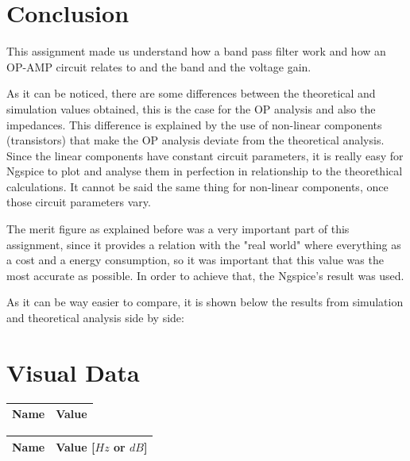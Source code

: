 \section{Conclusion}
\label{sec:conclusion}

This assignment made us understand how a band pass filter work and how an OP-AMP circuit relates to and the band and the voltage gain.\par
As it can be noticed, there are some differences between the theoretical and simulation values obtained, this is the case for the OP analysis and also the impedances. This difference is explained by the use of non-linear components (transistors) that make the OP analysis deviate from the theoretical analysis. Since the linear components have constant circuit parameters, it is really easy for Ngspice to plot and analyse them in perfection in relationship to the theorethical calculations. It cannot be said the same thing for non-linear components, once those circuit parameters vary. \par
The merit figure as explained before was a very important part of this assignment, since it provides a relation with the "real world" where everything as a cost and a energy consumption, so it was important that this value was the most accurate as possible. In order to achieve that, the Ngspice's result was used. \par
As it can be way easier to compare, it is shown below the results from simulation and theoretical analysis side by side: \par

\section{Visual Data}
\label{sec:data}

\begin{center}
  \begin{tabular}{ | c | c | }
    \hline    
    {\bf Name} & {\bf Value} \\ \hline
    
  \end{tabular}
\end{center}

\begin{center}
  \begin{tabular}{ | c | c | }
    \hline    
    {\bf Name} & {\bf Value [$Hz$ or $dB$]} \\ \hline
    
    \hline
  \end{tabular}
\end{center}

